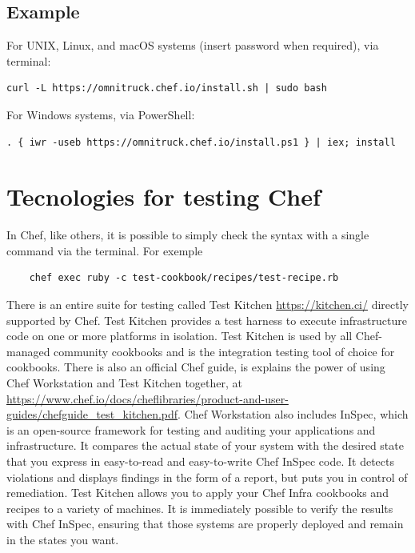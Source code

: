 \documentclass[12pt,a4paper,openright,twoside]{book}
\begin{document}
\cite{chefDocInstall}

\subsection{Example}

For UNIX, Linux, and macOS systems (insert password when required), via terminal:


\begin{lstlisting}
curl -L https://omnitruck.chef.io/install.sh | sudo bash
\end{lstlisting}


For Windows systems, via PowerShell:
\begin{lstlisting}
. { iwr -useb https://omnitruck.chef.io/install.ps1 } | iex; install
\end{lstlisting}


\cite{chefDocInstall}

\section{Tecnologies for testing Chef}
In Chef, like others, it is possible to simply check the syntax with a single command via the terminal.
For exemple\cite{chefTestMedium}
\begin{lstlisting}
    chef exec ruby -c test-cookbook/recipes/test-recipe.rb
\end{lstlisting}


There is an entire suite for testing called Test Kitchen \url{https://kitchen.ci/} directly supported by Chef.
Test Kitchen provides a test harness to execute infrastructure code on one or more platforms in isolation.\cite{chefTestKit}
Test Kitchen is used by all Chef-managed community cookbooks and is the integration testing tool of choice for cookbooks.\cite{chefTestKit}
There is also an official Chef guide, is explains the power of using Chef Workstation and Test Kitchen together, at \url{https://www.chef.io/docs/cheflibraries/product-and-user-guides/chefguide_test_kitchen.pdf}.
Chef Workstation also includes InSpec, which is an open-source framework for testing and auditing your applications and infrastructure. It compares the actual state of your system with the desired state that you express in easy-to-read and easy-to-write Chef InSpec code. It detects violations and displays findings in the form of a report, but puts you in control of remediation.\cite{chefInSpec}
Test Kitchen allows you to apply your Chef Infra cookbooks and recipes to a variety of machines. It is immediately possible to verify the results with Chef InSpec, ensuring that those systems are properly deployed and remain in the states you want.\cite{chefTestKitPdf}
\end{document}
